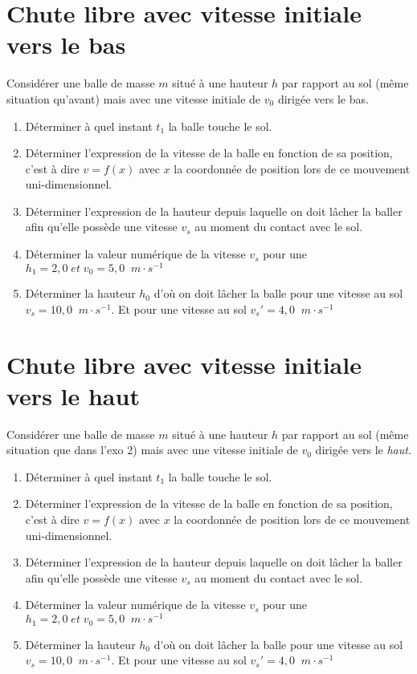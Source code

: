\documentclass[11pt,a4paper]{article}
\newcommand{\mps}{\; m\cdot s^{-1}}
\newcounter{exo}
\begin{document}
\section{Chute libre avec vitesse initiale vers le bas}
Considérer une balle de masse $m$ situé à une hauteur $h$ par rapport au sol (même situation qu'avant) mais avec une vitesse initiale de $v_0$ dirigée vers le bas. 
\begin{enumerate}
    \item Déterminer à quel instant $t_1$ la balle touche le sol.
    \item Déterminer l'expression de la vitesse de la balle en fonction de sa position, c'est à dire $v=f(x)$ avec $x$ la coordonnée de position lors de ce mouvement uni-dimensionnel. 
    \item Déterminer l'expression de la hauteur depuis laquelle on doit lâcher la baller afin qu'elle possède une vitesse $v_s$ au moment du contact avec le sol. 
    \item Déterminer la valeur numérique de la vitesse $v_s$ pour une $h_1=2,0\; et \; v_0=5,0 \; \mps $
    \item Déterminer la hauteur $h_0$ d'où on doit lâcher la balle pour une vitesse au sol $v_s = 10,0 \; \mps$. Et pour une vitesse au sol $v_s'=4,0\; \mps$
\end{enumerate}

\section{Chute libre avec vitesse initiale vers le haut}
Considérer une balle de masse $m$ situé à une hauteur $h$ par rapport au sol (même situation que dans l'exo 2) mais avec une vitesse initiale de $v_0$ dirigée vers le \textit{haut}. 
\begin{enumerate}
    \item Déterminer à quel instant $t_1$ la balle touche le sol.
    \item Déterminer l'expression de la vitesse de la balle en fonction de sa position, c'est à dire $v=f(x)$ avec $x$ la coordonnée de position lors de ce mouvement uni-dimensionnel. 
    \item Déterminer l'expression de la hauteur depuis laquelle on doit lâcher la baller afin qu'elle possède une vitesse $v_s$ au moment du contact avec le sol. 
    \item Déterminer la valeur numérique de la vitesse $v_s$ pour une $h_1=2,0\; et \; v_0=5,0 \; \mps $
    \item Déterminer la hauteur $h_0$ d'où on doit lâcher la balle pour une vitesse au sol $v_s = 10,0 \; \mps$. Et pour une vitesse au sol $v_s'=4,0\; \mps$
\end{enumerate}
\end{document}
